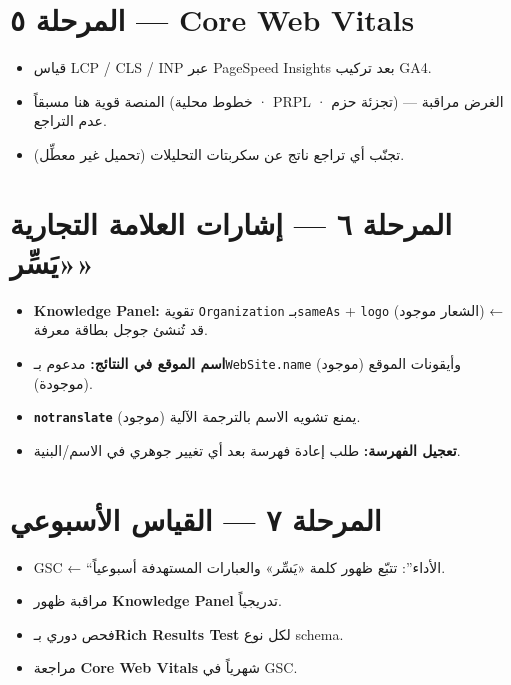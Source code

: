 \documentclass[11pt]{article}
\begin{document}
\section{المرحلة ٥ — Core Web Vitals}

\begin{itemize}
  \item قياس LCP / CLS / INP عبر PageSpeed Insights بعد تركيب GA4.
  \item المنصة قوية هنا مسبقاً (خطوط محلية · PRPL · تجزئة حزم) — الغرض مراقبة عدم التراجع.
  \item تجنّب أي تراجع ناتج عن سكربتات التحليلات (تحميل غير معطِّل).
\end{itemize}

\section{المرحلة ٦ — إشارات العلامة التجارية «يَسِّر»}

\begin{itemize}
  \item \textbf{Knowledge Panel:} تقوية \texttt{Organization} بـ\texttt{sameAs} + \texttt{logo}
        (الشعار موجود) ← قد تُنشئ جوجل بطاقة معرفة.
  \item \textbf{اسم الموقع في النتائج:} مدعوم بـ\texttt{WebSite.name} (موجود) وأيقونات الموقع (موجودة).
  \item \textbf{\texttt{notranslate}} (موجود) يمنع تشويه الاسم بالترجمة الآلية.
  \item \textbf{تعجيل الفهرسة:} طلب إعادة فهرسة بعد أي تغيير جوهري في الاسم/البنية.
\end{itemize}

\section{المرحلة ٧ — القياس الأسبوعي}

\begin{itemize}
  \item GSC ← ``الأداء'': تتبّع ظهور كلمة «يَسِّر» والعبارات المستهدفة أسبوعياً.
  \item مراقبة ظهور \textbf{Knowledge Panel} تدريجياً.
  \item فحص دوري بـ\textbf{Rich Results Test} لكل نوع schema.
  \item مراجعة \textbf{Core Web Vitals} شهرياً في GSC.
\end{itemize}
\end{document}
